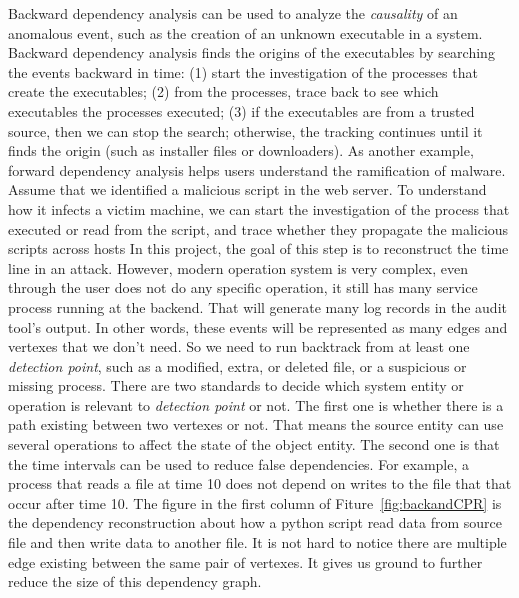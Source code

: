 Backward dependency analysis can be used to analyze the \emph{causality} of an anomalous event,
such as the creation of an unknown executable in a system.
Backward dependency analysis finds the origins of the executables by searching the events backward in time: 
(1) start the investigation of the processes that create the executables;
(2) from the processes, trace back to see which executables the processes executed;
(3) if the executables are from a trusted source, then we can stop the search; 
otherwise, the tracking continues until it finds the origin (such as installer files or downloaders).
As another example, forward dependency analysis helps users understand the ramification of malware.
Assume that we identified a malicious script in the web server. 
To understand how it infects a victim machine, we can start the investigation of the process that executed or read from the script,
and trace whether they propagate the malicious scripts across hosts
In this project, the goal of this step is to reconstruct the time line in an attack.
However, modern operation system is very complex, even through the user does not do any specific operation, it still has many service process running at the backend. That will generate many log records in the audit tool's output. In other words, these events will be represented as many edges and vertexes that we don't need. So we need to run backtrack\cite{backtracking, backtracking2} from at least one \textit{detection point}\cite{lamport1978time}, such as a modified, extra, or deleted file, or a suspicious or missing process. There are two standards to decide which system entity or operation is relevant to \textit{detection point} or not. The first one is whether there is a path existing between two vertexes or not. That means the source entity can use several operations to affect the state of the object entity. The second one is that the time intervals can be used to reduce false dependencies. For example, a process that reads a file at time 10 does not depend on writes to the file that that occur after time 10. The figure in the first column of Fiture~\ref{fig:backandCPR} is the dependency reconstruction about how a python script read data from source file and then write data to another file. It is not hard to notice there are multiple edge existing between the same pair of vertexes. It gives us ground to further reduce the size of this dependency graph.
